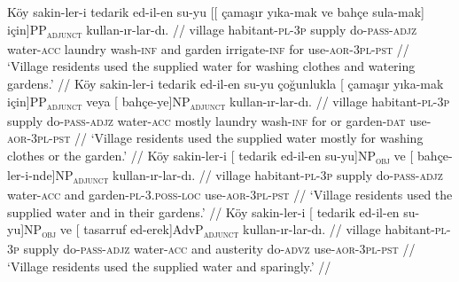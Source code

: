 \pex[exno=TS10, glspace=!1em,everygla={},everyglb={},aboveglbskip=-.15ex, interpartskip=15pt]
\label{TS10}
\a
\begingl
\gla Köy sakin-ler-i tedarik ed-il-en su-yu {[[} çamaşır yıka-mak ve bahçe {sula-mak}] {için}]PP\textsubscript{\textsc{adjunct}} kullan-ır-lar-dı. //
\glb village habitant-\textsc{pl}-\textsc{3p} supply do-\textsc{pass}-\textsc{adjz} water-\textsc{acc} {} laundry wash-\textsc{inf} and garden irrigate-\textsc{inf} for use-\textsc{aor}-\textsc{3pl}-\textsc{pst}   //
\glft `Village residents used the supplied water for washing clothes and watering gardens.' //
\endgl
\a
\begingl
\gla Köy sakin-ler-i tedarik ed-il-en su-yu çoğunlukla {[} çamaşır yıka-mak { için]}PP\textsubscript{\textsc{adjunct}} veya {[} {bahçe-ye]}NP\textsubscript{\textsc{adjunct}} kullan-ır-lar-dı. //
\glb village habitant-\textsc{pl}-\textsc{3p} supply do-\textsc{pass}-\textsc{adjz} water-\textsc{acc} mostly laundry wash-\textsc{inf} for or garden-\textsc{dat} use-\textsc{aor}-\textsc{3pl}-\textsc{pst} //
\glft `Village residents used the supplied water mostly for washing clothes or the garden.' //
\endgl
\a
\begingl
\gla Köy sakin-ler-i {[} tedarik ed-il-en {su-yu]}NP\textsubscript{\textsc{obj}} ve {[} {bahçe-ler-i-nde]}NP\textsubscript{\textsc{adjunct}}  kullan-ır-lar-dı. //
\glb village habitant-\textsc{pl}-\textsc{3p} supply do-\textsc{pass}-\textsc{adjz} water-\textsc{acc} and garden-\textsc{pl}-\textsc{3.poss}-\textsc{loc} use-\textsc{aor}-\textsc{3pl}-\textsc{pst}  //
\glft `Village residents used the supplied water and in their gardens.' //
\endgl
\a
\begingl
\gla Köy sakin-ler-i {[} tedarik ed-il-en {su-yu]}NP\textsubscript{\textsc{obj}} ve {[} tasarruf {ed-erek]}AdvP\textsubscript{\textsc{adjunct}} kullan-ır-lar-dı. //
\glb  village habitant-\textsc{pl}-\textsc{3p} supply do-\textsc{pass}-\textsc{adjz} water-\textsc{acc} and austerity do-\textsc{advz} use-\textsc{aor}-\textsc{3pl}-\textsc{pst} //
\glft `Village residents used the supplied water and sparingly.' //
\endgl
\xe

